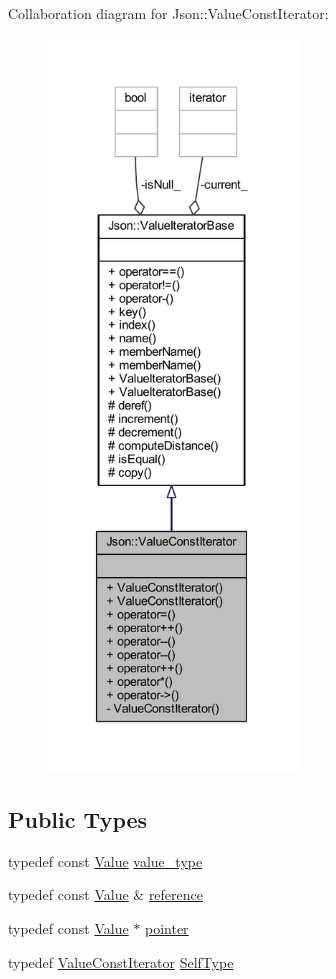 Collaboration diagram for Json\+:\+:Value\+Const\+Iterator\+:\nopagebreak
\begin{figure}[H]
\begin{center}
\leavevmode
\includegraphics[height=550pt]{class_json_1_1_value_const_iterator__coll__graph}
\end{center}
\end{figure}
\subsection*{Public Types}
\begin{DoxyCompactItemize}
\item 
typedef const \hyperlink{class_json_1_1_value}{Value} \hyperlink{class_json_1_1_value_const_iterator_aa5f1707dcef4bfe73e23ddc14dbe760d}{value\+\_\+type}
\item 
typedef const \hyperlink{class_json_1_1_value}{Value} \& \hyperlink{class_json_1_1_value_const_iterator_aa9b05c6a37cd352ea1ee6e13b816f709}{reference}
\item 
typedef const \hyperlink{class_json_1_1_value}{Value} $\ast$ \hyperlink{class_json_1_1_value_const_iterator_a400136bd8bc09e9fddec0785fa2cff14}{pointer}
\item 
typedef \hyperlink{class_json_1_1_value_const_iterator}{Value\+Const\+Iterator} \hyperlink{class_json_1_1_value_const_iterator_a0c2e33e7eb5a80dd8709fb28ece83933}{Self\+Type}
\end{DoxyCompactItemize}

